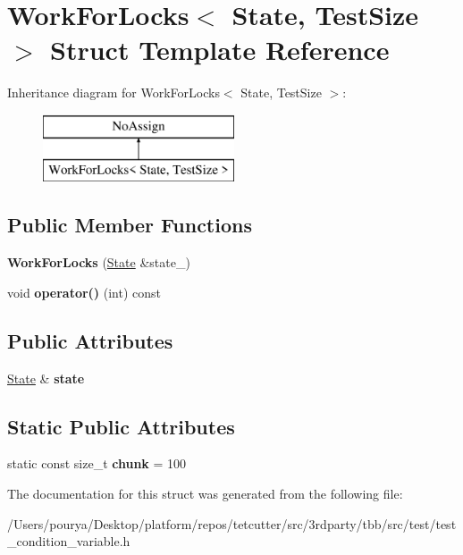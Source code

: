 \hypertarget{structWorkForLocks}{}\section{Work\+For\+Locks$<$ State, Test\+Size $>$ Struct Template Reference}
\label{structWorkForLocks}
Inheritance diagram for Work\+For\+Locks$<$ State, Test\+Size $>$\+:\begin{figure}[H]
\begin{center}
\leavevmode
\includegraphics[height=2.000000cm]{structWorkForLocks}
\end{center}
\end{figure}
\subsection*{Public Member Functions}
\begin{DoxyCompactItemize}
\item 
\hypertarget{structWorkForLocks_ab0ec798265d7703bc4e92500c9d7df0b}{}{\bfseries Work\+For\+Locks} (\hyperlink{structState}{State} \&state\+\_\+)\label{structWorkForLocks_ab0ec798265d7703bc4e92500c9d7df0b}

\item 
\hypertarget{structWorkForLocks_aa4e0781961d33f19a2ded378d8ebcf68}{}void {\bfseries operator()} (int) const \label{structWorkForLocks_aa4e0781961d33f19a2ded378d8ebcf68}

\end{DoxyCompactItemize}
\subsection*{Public Attributes}
\begin{DoxyCompactItemize}
\item 
\hypertarget{structWorkForLocks_ad8dffc5cdf29edf7c7cbea9ceb3d374e}{}\hyperlink{structState}{State} \& {\bfseries state}\label{structWorkForLocks_ad8dffc5cdf29edf7c7cbea9ceb3d374e}

\end{DoxyCompactItemize}
\subsection*{Static Public Attributes}
\begin{DoxyCompactItemize}
\item 
\hypertarget{structWorkForLocks_a80af58de29b47c0ff9dbb4c43ab829f1}{}static const size\+\_\+t {\bfseries chunk} = 100\label{structWorkForLocks_a80af58de29b47c0ff9dbb4c43ab829f1}

\end{DoxyCompactItemize}


The documentation for this struct was generated from the following file\+:\begin{DoxyCompactItemize}
\item 
/\+Users/pourya/\+Desktop/platform/repos/tetcutter/src/3rdparty/tbb/src/test/test\+\_\+condition\+\_\+variable.\+h\end{DoxyCompactItemize}
